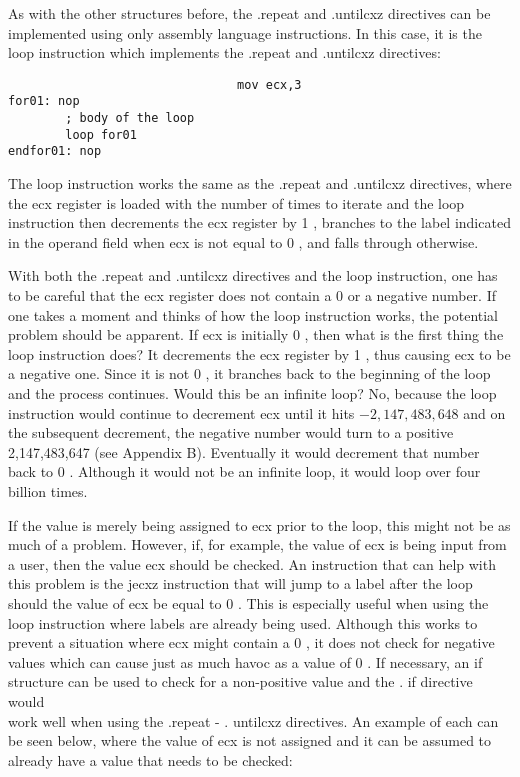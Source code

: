 \documentclass[10pt]{article}
\begin{document}
As with the other structures before, the .repeat and .untilcxz directives can be implemented using only assembly language instructions. In this case, it is the loop instruction which implements the .repeat and .untilcxz directives:

\begin{verbatim}
                                mov ecx,3
for01: nop
        ; body of the loop
        loop for01
endfor01: nop
\end{verbatim}

The loop instruction works the same as the .repeat and .untilcxz directives, where the ecx register is loaded with the number of times to iterate and the loop instruction then decrements the ecx register by 1 , branches to the label indicated in the operand field when ecx is not equal to 0 , and falls through otherwise.

With both the .repeat and .untilcxz directives and the loop instruction, one has to be careful that the ecx register does not contain a 0 or a negative number. If one takes a moment and thinks of how the loop instruction works, the potential problem should be apparent. If ecx is initially 0 , then what is the first thing the loop instruction does? It decrements the ecx register by 1 , thus causing ecx to be a negative one. Since it is not 0 , it branches back to the beginning of the loop and the process continues. Would this be an infinite loop? No, because the loop instruction would continue to decrement ecx until it hits $-2,147,483,648$ and on the subsequent decrement, the negative number would turn to a positive 2,147,483,647 (see Appendix B). Eventually it would decrement that number back to 0 . Although it would not be an infinite loop, it would loop over four billion times.

If the value is merely being assigned to ecx prior to the loop, this might not be as much of a problem. However, if, for example, the value of ecx is being input from a user, then the value ecx should be checked. An instruction that can help with this problem is the jecxz instruction that will jump to a label after the loop should the value of ecx be equal to 0 . This is especially useful when using the loop instruction where labels are already being used. Although this works to prevent a situation where ecx might contain a 0 , it does not check for negative values which can cause just as much havoc as a value of 0 . If necessary, an if structure can be used to check for a non-positive value and the . if directive would\\
work well when using the .repeat - . untilcxz directives. An example of each can be seen below, where the value of ecx is not assigned and it can be assumed to already have a value that needs to be checked:
\end{document}

